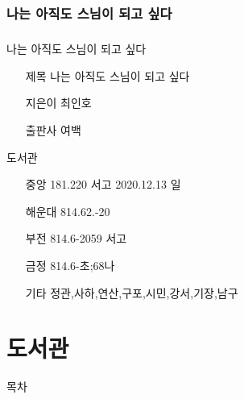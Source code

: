 \documentclass[aspectratio=1610,17pt,xcolor=pdftex,dvipsnames,table,handout]{beamer}
\begin{document}
		\section{나는 아직도 스님이 되고 싶다}
		\begin{frame} [t,plain]
		\frametitle{}

			\begin{block} {나는 아직도 스님이 되고 싶다}
			\setlength{\leftmargini}{4em}			
			\begin{itemize}
				\item [제목]  	나는 아직도 스님이 되고 싶다
				\item [지은이]	최인호
				\item [출판사]	여백
			\end{itemize}
			\end{block}						

			\begin{block} {도서관}
			\setlength{\leftmargini}{4em}			
			\begin{itemize}
				\item [중앙]  	181.220 서고 		2020.12.13 일
				\item [해운대]	814.62.-20
				\item [부전]		814.6-2059 서고
				\item [금정]		814.6-초;68나
				\item [기타]		정관,사하,연산,구포,시민,강서,기장,남구
			\end{itemize}
			\end{block}						

		\end{frame}						


		\part{ 도서관 }
		\frame{\partpage}

		\begin{frame} [plain]{목차}
		\tableofcontents%
		\end{frame}



\end{document}
